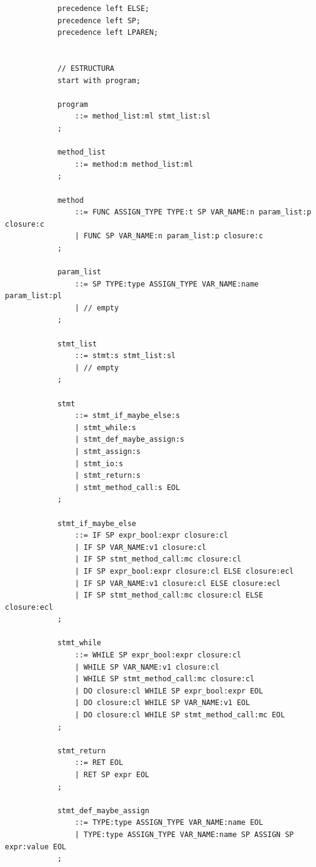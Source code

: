 \documentclass{article}
\begin{document}
\begin{lstlisting}
            precedence left ELSE;
            precedence left SP;
            precedence left LPAREN;
            
            
            // ESTRUCTURA
            start with program;
            
            program
            	::= method_list:ml stmt_list:sl
            ;
            
            method_list
            	::= method:m method_list:ml
            ;
            
            method
            	::= FUNC ASSIGN_TYPE TYPE:t SP VAR_NAME:n param_list:p closure:c
            	| FUNC SP VAR_NAME:n param_list:p closure:c
            ;
            
            param_list
            	::= SP TYPE:type ASSIGN_TYPE VAR_NAME:name param_list:pl
            	| // empty
            ;
            
            stmt_list
            	::= stmt:s stmt_list:sl
            	| // empty
            ;
            
            stmt
            	::= stmt_if_maybe_else:s
            	| stmt_while:s
            	| stmt_def_maybe_assign:s
            	| stmt_assign:s
            	| stmt_io:s
            	| stmt_return:s
            	| stmt_method_call:s EOL
            ;
            
            stmt_if_maybe_else
            	::= IF SP expr_bool:expr closure:cl
            	| IF SP VAR_NAME:v1 closure:cl
                | IF SP stmt_method_call:mc closure:cl
            	| IF SP expr_bool:expr closure:cl ELSE closure:ecl
                | IF SP VAR_NAME:v1 closure:cl ELSE closure:ecl
                | IF SP stmt_method_call:mc closure:cl ELSE closure:ecl
            ;
            
            stmt_while
            	::= WHILE SP expr_bool:expr closure:cl
            	| WHILE SP VAR_NAME:v1 closure:cl
               	| WHILE SP stmt_method_call:mc closure:cl
               	| DO closure:cl WHILE SP expr_bool:expr EOL
               	| DO closure:cl WHILE SP VAR_NAME:v1 EOL
               	| DO closure:cl WHILE SP stmt_method_call:mc EOL
            ;
            
            stmt_return
            	::= RET EOL
            	| RET SP expr EOL
            ;
            
            stmt_def_maybe_assign
            	::= TYPE:type ASSIGN_TYPE VAR_NAME:name EOL
            	| TYPE:type ASSIGN_TYPE VAR_NAME:name SP ASSIGN SP expr:value EOL
            ;
            

\end{lstlisting}
\end{document}
